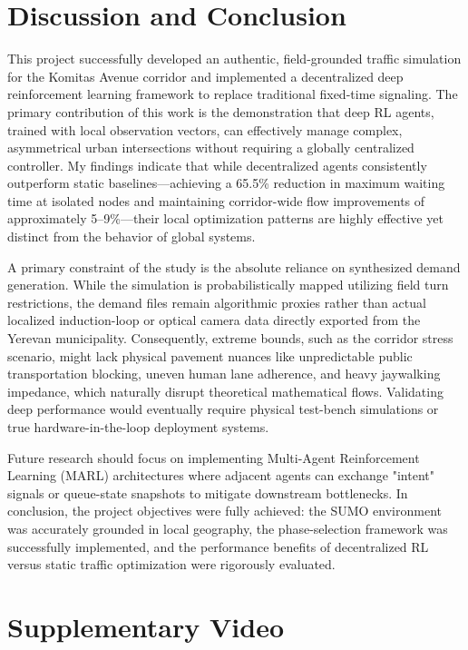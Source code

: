 \documentclass[conference]{IEEEtran}
\begin{document}
\section{Discussion and Conclusion}

This project successfully developed an authentic, field-grounded traffic simulation for the Komitas Avenue corridor and implemented a decentralized deep reinforcement learning framework to replace traditional fixed-time signaling. The primary contribution of this work is the demonstration that deep RL agents, trained with local observation vectors, can effectively manage complex, asymmetrical urban intersections without requiring a globally centralized controller. My findings indicate that while decentralized agents consistently outperform static baselines—achieving a 65.5\% reduction in maximum waiting time at isolated nodes and maintaining corridor-wide flow improvements of approximately 5--9\%—their local optimization patterns are highly effective yet distinct from the behavior of global systems.

A primary constraint of the study is the absolute reliance on synthesized demand generation. While the simulation is probabilistically mapped utilizing field turn restrictions, the demand files remain algorithmic proxies rather than actual localized induction-loop or optical camera data directly exported from the Yerevan municipality. Consequently, extreme bounds, such as the corridor stress scenario, might lack physical pavement nuances like unpredictable public transportation blocking, uneven human lane adherence, and heavy jaywalking impedance, which naturally disrupt theoretical mathematical flows. Validating deep performance would eventually require physical test-bench simulations or true hardware-in-the-loop deployment systems.

Future research should focus on implementing Multi-Agent Reinforcement Learning (MARL) architectures where adjacent agents can exchange "intent" signals or queue-state snapshots to mitigate downstream bottlenecks. In conclusion, the project objectives were fully achieved: the SUMO environment was accurately grounded in local geography, the phase-selection framework was successfully implemented, and the performance benefits of decentralized RL versus static traffic optimization were rigorously evaluated.

\appendices

\section{Supplementary Video}
\end{document}
